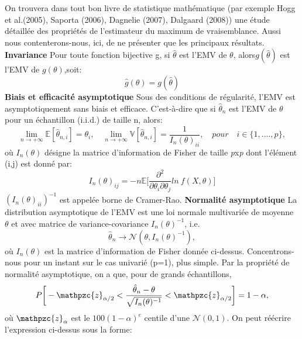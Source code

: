 \documentclass[french]{report}
\begin{document}
\vskip 0.1in
On trouvera dans tout bon livre de statistique mathématique (par exemple Hogg et al.\cite{Max de vraisemblance4}(2005), Saporta\cite{Max de vraisemblance5} (2006), Dagnelie\cite{Max de vraisemblance2} (2007), Dalgaard\cite{Max de vraisemblance3} (2008)) une étude détaillée des propriétés de l’estimateur du maximum de vraisemblance. Aussi nous contenterons-nous, ici, de ne présenter que les principaux résultats.
\vskip 0.1in
\textbf{Invariance} Pour toute fonction bijective g, si $\hat{\theta}$ est l’EMV de $\theta$, alors$g(\hat{\theta})$ est l’EMV de $g(\theta)$,soit:
\begin{equation*}
    \hat{g}(\theta) = g(\hat{\theta})
\end{equation*}
\vskip 0.1in
\textbf{Biais et efficacité asymptotique} Sous des conditions de régularité, l'EMV est asymptotiquement sans biais et efficace. C'est-à-dire que si $\hat{\theta}_n$ est l'EMV de $\theta$ pour un échantillon (i.i.d.) de taille n, alors:
\begin{equation*}
    \lim_{n\to +\infty} \mathbb{E}[\hat{\theta}_{n,i}] = \theta_i, \quad
    \lim_{n\to +\infty} \mathbb{V}[\hat{\theta}_{n,i}] = \frac{1}{I_n(\theta)_{ii}}, \quad
pour \quad i \in \{1,....,p\},
\end{equation*}
où $I_n(\theta)$ désigne la matrice d’information de Fisher de taille \textit{p}x\textit{p} dont l'élément (i,j) est donné par:
\begin{equation*}
    I_n(\theta)_{ij} = -n \mathbb{E}\bigg[\frac{\partial ^2}{\partial \theta_i\partial \theta_j} ln \: f(X,\theta)\bigg]
\end{equation*}
$(I_n(\theta)_{ii})^{-1}$ est appelée borne de Cramer-Rao.
\vskip 0.1in
\textbf{Normalité asymptotique} La distribution asymptotique de l’EMV est une loi normale multivariée de moyenne $\theta$ et avec matrice de variance-covariance $I_n(\theta)^{-1}$, i.e.
\begin{equation*}
    \hat{\theta}_n \rightarrow \mathcal{N}(\theta,I_n(\theta)^{-1}), 
\end{equation*}
où $I_n(\theta)$ est la matrice d'information de Fisher donnée ci-dessus.
\vskip 0.2in
Concentrons-nous pour un instant sur le cas univarié (p=1), plus simple. Par la propriété de normalité asymptotique, on a que, pour de grands échantillons,
\begin{equation*}
    P \bigg[-\mathpzc{z}_{\alpha/2} < \frac{\hat{\theta}_n - \theta}{\sqrt{I_n(\theta)^{-1}}} < \mathpzc{z}_{\alpha/2}\bigg] = 1- \alpha,
\end{equation*}
où $\mathpzc{z}_{\alpha}$ est le $100(1 - \alpha)^e$ centile d'une $\mathcal{N}(0,1)$. On peut réécrire l’expression ci-dessus sous la forme: 
\end{document}
